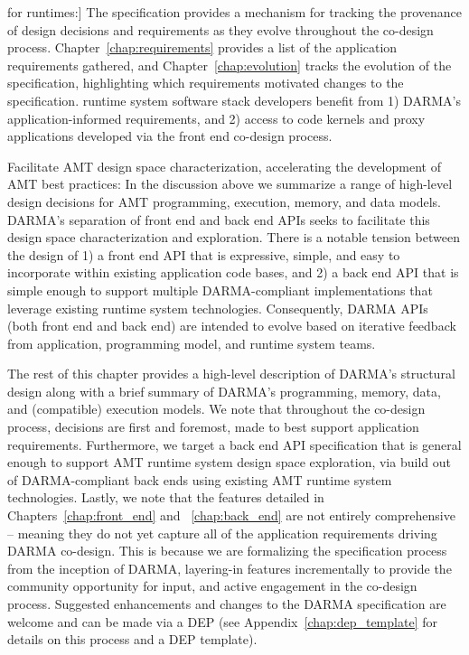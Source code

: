 \begin{compactdesc}
  for runtimes:]
  The specification provides a mechanism for tracking the
  provenance of design decisions and requirements as they evolve throughout the
  \gls{co-design} process. Chapter~\ref{chap:requirements} provides a list of the application
  requirements gathered,  and Chapter~\ref{chap:evolution} tracks the evolution of
  the specification, highlighting which requirements motivated changes to the specification.
  \Gls{runtime system} software stack developers benefit 
  from 1) \gls{DARMA}’s application-informed requirements, and 2) access to code
  kernels and proxy applications developed via the \gls{front end}
  \gls{co-design} process.
\item[Facilitate AMT design space characterization, accelerating the
development of AMT best practices:]
  In the discussion above we summarize a range of high-level design decisions for
  \gls{AMT} programming, execution, memory, and data models. \gls{DARMA}'s
  separation of \gls{front end} and \gls{back end} \glspl{API} seeks to
  facilitate this design space characterization and exploration.  There 
  is a notable tension between the design of 1) a \gls{front end} \gls{API} that is expressive, simple, 
  and easy to incorporate within existing application code bases, and 2) a
  \gls{back end} \gls{API} that is simple enough 
  to support multiple \gls{DARMA}-compliant implementations that leverage existing \gls{runtime
  system} technologies. 
  Consequently, \gls{DARMA} \gls{API}s (both \gls{front end} and \gls{back end}) are
  intended to evolve based on iterative feedback from 
  application, \gls{programming model}, and \gls{runtime system} teams. 
\end{compactdesc}


The rest of this chapter provides a high-level description of 
\gls{DARMA}'s structural design  along with a brief summary of \gls{DARMA}'s programming,
memory, data, and (compatible) execution models. We note that throughout the
\gls{co-design} process, decisions are first and foremost, 
made to best support application requirements.  Furthermore, we target a
\gls{back end} \gls{API} specification that is general enough to support 
\gls{AMT} \gls{runtime system}
design space exploration, via build out of \gls{DARMA}-compliant
back ends using existing \gls{AMT} \gls{runtime system}
technologies.
Lastly, we note that the features detailed in Chapters~\ref{chap:front_end} and
~\ref{chap:back_end}  are not entirely comprehensive -- meaning they do not yet capture all of the
application requirements driving \gls{DARMA} \gls{co-design}.  This is because 
we are formalizing the specification process from the inception of \gls{DARMA}, layering-in features incrementally to
provide the community opportunity for input, and active engagement in the
\gls{co-design} process.  Suggested enhancements and changes 
to the \gls{DARMA} specification are welcome and can be made via a \gls{DEP} (see
Appendix~\ref{chap:dep_template} for details on this process and a \gls{DEP} template). 

